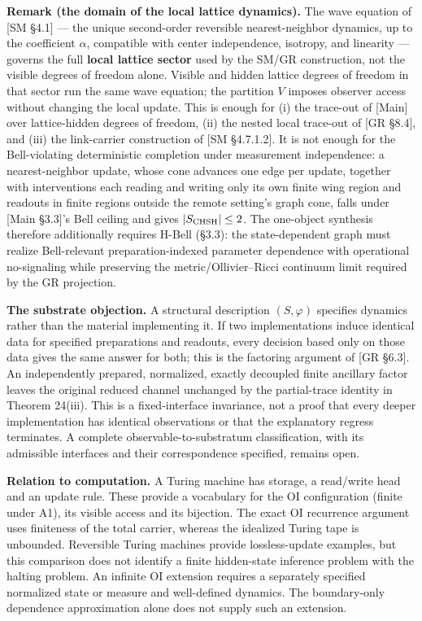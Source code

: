 \documentclass[
]{article}
\begin{document}
\textbf{Remark (the domain of the local lattice dynamics).} The wave
equation of {[}SM §4.1{]} --- the unique second-order reversible
nearest-neighbor dynamics, up to the coefficient \(\alpha\), compatible
with center independence, isotropy, and linearity --- governs the full
\textbf{local lattice sector} used by the SM/GR construction, not the
visible degrees of freedom alone. Visible and hidden lattice degrees of
freedom in that sector run the same wave equation; the partition \(V\)
imposes observer access without changing the local update. This is
enough for (i) the trace-out of {[}Main{]} over lattice-hidden degrees
of freedom, (ii) the nested local trace-out of {[}GR §8.4{]}, and (iii)
the link-carrier construction of {[}SM §4.7.1.2{]}. It is not enough for
the Bell-violating deterministic completion under measurement
independence: a nearest-neighbor update, whose cone advances one edge
per update, together with interventions each reading and writing only
its own finite wing region and readouts in finite regions outside the
remote setting's graph cone, falls under {[}Main §3.3{]}'s Bell ceiling
and gives \(|S_{\rm CHSH}|\le2\). The one-object synthesis therefore
additionally requires H-Bell (§3.3): the state-dependent graph must
realize Bell-relevant preparation-indexed parameter dependence with
operational no-signaling while preserving the metric/Ollivier--Ricci
continuum limit required by the GR projection.

\textbf{The substrate objection.} A structural description
\((S,\varphi)\) specifies dynamics rather than the material implementing
it. If two implementations induce identical data for specified
preparations and readouts, every decision based only on those data gives
the same answer for both; this is the factoring argument of {[}GR
§6.3{]}. An independently prepared, normalized, exactly decoupled finite
ancillary factor leaves the original reduced channel unchanged by the
partial-trace identity in Theorem 24(iii). This is a fixed-interface
invariance, not a proof that every deeper implementation has identical
observations or that the explanatory regress terminates. A complete
observable-to-substratum classification, with its admissible interfaces
and their correspondence specified, remains open.

\textbf{Relation to computation.} A Turing machine has storage, a
read/write head and an update rule. These provide a vocabulary for the
OI configuration (finite under A1), its visible access and its
bijection. The exact OI recurrence argument uses finiteness of the total
carrier, whereas the idealized Turing tape is unbounded. Reversible
Turing machines provide lossless-update examples, but this comparison
does not identify a finite hidden-state inference problem with the
halting problem. An infinite OI extension requires a separately
specified normalized state or measure and well-defined dynamics. The
boundary-only dependence approximation alone does not supply such an
extension.
\end{document}

